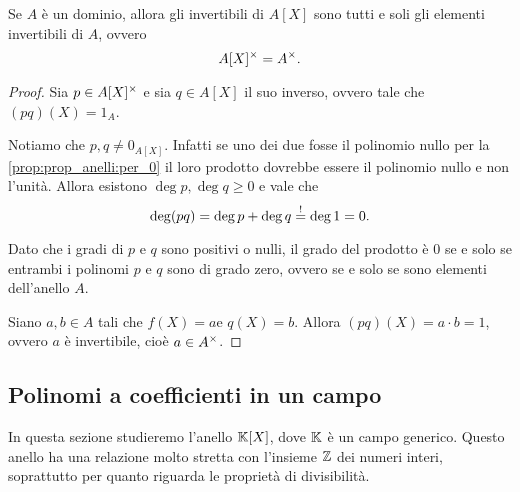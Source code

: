 \begin{corollary}
    Se $A$ è un dominio, allora gli invertibili di $A[X]$ sono tutti e soli gli elementi invertibili di $A$, ovvero \[
        A[X]^{\times} = A^{\times}. 
    \]
\end{corollary}
\begin{proof}
    Sia $p \in A[X]^{\times}$ e sia $q \in A[X]$ il suo inverso, ovvero tale che $(pq)(X) = 1_A$.

    Notiamo che $p, q \neq 0_{A[X]}$. Infatti se uno dei due fosse il polinomio nullo per la \autoref{prop:prop_anelli:per_0} il loro prodotto dovrebbe essere il polinomio nullo e non l'unità. Allora esistono $\deg p, \deg q \geq 0$ e vale che \[
        \deg (pq) = \deg p + \deg q \overset{!}{=} \deg 1 = 0.    
    \]

    Dato che i gradi di $p$ e $q$ sono positivi o nulli, il grado del prodotto è $0$ se e solo se entrambi i polinomi $p$ e $q$ sono di grado zero, ovvero se e solo se sono elementi dell'anello $A$.

    Siano $a, b \in A$ tali che $f(X) = a$e $q(X) = b$. Allora $(pq)(X) = a\cdot b = 1$, ovvero $a$ è invertibile, cioè $a \in A^{\times}$.
\end{proof}

\subsection{Polinomi a coefficienti in un campo}

In questa sezione studieremo l'anello $\mathbb{K}[X]$, dove $\mathbb{K}$ è un campo generico. Questo anello ha una relazione molto stretta con l'insieme $\mathbb{Z}$ dei numeri interi, soprattutto per quanto riguarda le proprietà di divisibilità.

